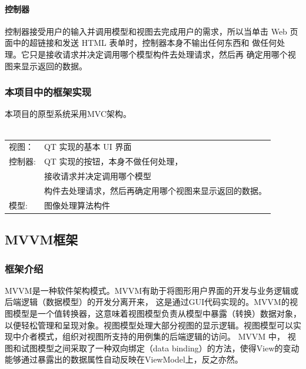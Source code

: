 \documentclass[14pt,a4paper]{article}
\begin{document}
\paragraph*{控制器}
控制器接受用户的输入并调用模型和视图去完成用户的需求，所以当单击
Web 页面中的超链接和发送 HTML 表单时，控制器本身不输出任何东西和
做任何处理。它只是接收请求并决定调用哪个模型构件去处理请求，然后再
确定用哪个视图来显示返回的数据。

\subsubsection{本项目中的框架实现}
\nopagebreak
本项目的原型系统采用MVC架构。\\\\
\begin{tabular}{ll}
视图： & QT 实现的基本 UI 界面 \\ 
控制器: & QT 实现的按钮，本身不做任何处理，\\
		   & 接收请求并决定调用哪个模型 \\
		    & 构件去处理请求，然后再确定用哪个视图来显示返回的数据。 \\
模型:		& 图像处理算法构件
\end{tabular}

\newpage
\subsection{MVVM框架}

\subsubsection{框架介绍}
MVVM是一种软件架构模式。MVVM有助于将图形用户界面的开发与业务逻辑或后端逻辑（数据模型）的开发分离开来，
这是通过GUI代码实现的。MVVM的视图模型是一个值转换器，这意味着视图模型负责从模型中暴露（转换）数据对象，以便轻松管理和呈现对象。视图模型处理大部分视图的显示逻辑。视图模型可以实现中介者模式，组织对视图所支持的用例集的后端逻辑的访问。
MVVM 中， 视图和试图模型之间采取了一种双向绑定（data binding）的方法，使得View的变动能够通过暴露出的数据属性自动反映在ViewModel上，反之亦然。
\end{document}
